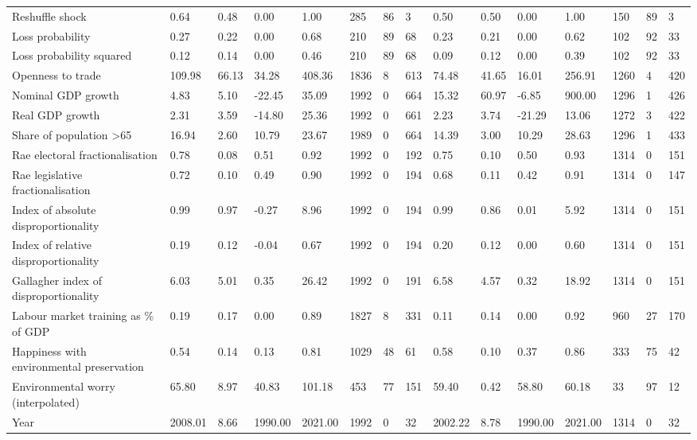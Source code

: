 \begin{longtable}{lllllllllllllll}
Reshuffle shock & 0.64 & 0.48 & 0.00 & 1.00 & 285 & 86 & 3 & 0.50 & 0.50 & 0.00 & 1.00 & 150 & 89 & 3\\
Loss probability & 0.27 & 0.22 & 0.00 & 0.68 & 210 & 89 & 68 & 0.23 & 0.21 & 0.00 & 0.62 & 102 & 92 & 33\\
\addlinespace
Loss probability squared & 0.12 & 0.14 & 0.00 & 0.46 & 210 & 89 & 68 & 0.09 & 0.12 & 0.00 & 0.39 & 102 & 92 & 33\\
Openness to trade & 109.98 & 66.13 & 34.28 & 408.36 & 1836 & 8 & 613 & 74.48 & 41.65 & 16.01 & 256.91 & 1260 & 4 & 420\\
Nominal GDP growth & 4.83 & 5.10 & -22.45 & 35.09 & 1992 & 0 & 664 & 15.32 & 60.97 & -6.85 & 900.00 & 1296 & 1 & 426\\
Real GDP growth & 2.31 & 3.59 & -14.80 & 25.36 & 1992 & 0 & 661 & 2.23 & 3.74 & -21.29 & 13.06 & 1272 & 3 & 422\\
Share of population >65 & 16.94 & 2.60 & 10.79 & 23.67 & 1989 & 0 & 664 & 14.39 & 3.00 & 10.29 & 28.63 & 1296 & 1 & 433\\
\addlinespace
Rae electoral fractionalisation & 0.78 & 0.08 & 0.51 & 0.92 & 1992 & 0 & 192 & 0.75 & 0.10 & 0.50 & 0.93 & 1314 & 0 & 151\\
Rae legislative fractionalisation & 0.72 & 0.10 & 0.49 & 0.90 & 1992 & 0 & 194 & 0.68 & 0.11 & 0.42 & 0.91 & 1314 & 0 & 147\\
Index of absolute disproportionality & 0.99 & 0.97 & -0.27 & 8.96 & 1992 & 0 & 194 & 0.99 & 0.86 & 0.01 & 5.92 & 1314 & 0 & 151\\
Index of relative disproportionality & 0.19 & 0.12 & -0.04 & 0.67 & 1992 & 0 & 194 & 0.20 & 0.12 & 0.00 & 0.60 & 1314 & 0 & 151\\
Gallagher index of disproportionality & 6.03 & 5.01 & 0.35 & 26.42 & 1992 & 0 & 191 & 6.58 & 4.57 & 0.32 & 18.92 & 1314 & 0 & 151\\
\addlinespace
Labour market training as \% of GDP & 0.19 & 0.17 & 0.00 & 0.89 & 1827 & 8 & 331 & 0.11 & 0.14 & 0.00 & 0.92 & 960 & 27 & 170\\
Happiness with environmental preservation & 0.54 & 0.14 & 0.13 & 0.81 & 1029 & 48 & 61 & 0.58 & 0.10 & 0.37 & 0.86 & 333 & 75 & 42\\
Environmental worry (interpolated) & 65.80 & 8.97 & 40.83 & 101.18 & 453 & 77 & 151 & 59.40 & 0.42 & 58.80 & 60.18 & 33 & 97 & 12\\
Year & 2008.01 & 8.66 & 1990.00 & 2021.00 & 1992 & 0 & 32 & 2002.22 & 8.78 & 1990.00 & 2021.00 & 1314 & 0 & 32\\
\bottomrule
\end{longtable}
